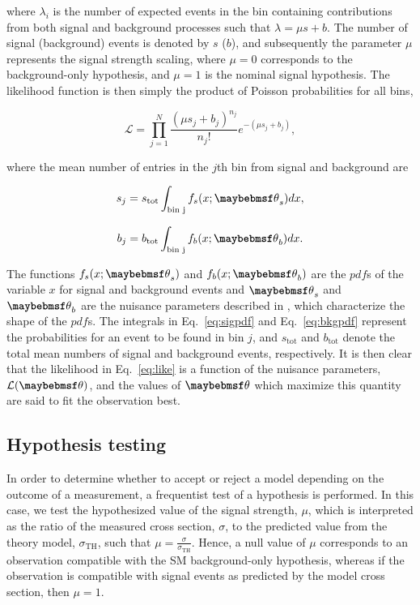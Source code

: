where $\lambda_{i}$ is the number of expected events in the bin containing contributions from both signal and background processes such that $\lambda = \mu s + b$. The number of signal (background) events is denoted by $s$ ($b$), and subsequently the parameter $\mu$ represents the signal strength scaling, where $\mu=0$ corresponds to the background-only hypothesis, and $\mu=1$ is the nominal signal hypothesis. The likelihood function is then simply the product of Poisson probabilities for all bins,

\begin{equation}
  \mathcal{L} = \prod_{j=1}^{N}\frac{(\mu s_{j}+b_{j})^{n_j}}{n_{j}!}e^{-(\mu s_j + b_j)},
  \label{eq:like}
\end{equation}

where the mean number of entries in the $j$th bin from signal and background are

\begin{equation}
  s_{j}  = s_{\textrm{tot}}\int_{\textrm{bin j}} f_{s}(x;\textbf{\theta}_{s})dx, 
\label{eq:sigpdf}
\end{equation}

\begin{equation}
  b_{j}  = b_{\textrm{tot}}\int_{\textrm{bin j}} f_{b}(x;\textbf{\theta}_{b})dx. 
\label{eq:bkgpdf}
\end{equation}

The functions $f_{s}(x;\textbf{\theta}_{s})$ and $f_{b}(x;\textbf{\theta}_{b})$ are the $pdf$s of the variable $x$ for signal and background events and $\textbf{\theta}_s$ and $\textbf{\theta}_b$ are the nuisance parameters described in , which characterize the shape of the $pdf$s. The integrals in Eq.~\ref{eq:sigpdf} and Eq.~\ref{eq:bkgpdf} represent the probabilities for an event to be found in bin $j$, and $s_\mathrm{tot}$ and $b_\mathrm{tot}$ denote the total mean numbers of signal and background events, respectively. It is then clear that the likelihood in Eq.~\ref{eq:like} is a function of the nuisance parameters, $\mathcal{L}(\textbf{\theta})$, and the values of $\textbf{\theta}$ which maximize this quantity are said to fit the observation best.

\subsection{Hypothesis testing}
\label{subsec:hypothesis}

In order to determine whether to accept or reject a model depending on the outcome of a measurement, a frequentist test of a hypothesis is performed. In this case, we test the hypothesized value of the signal strength, $\mu$, which is interpreted as the ratio of the measured cross section, $\sigma$, to the predicted value from the theory model, $\sigma_{\textrm{TH}}$, such that $\mu=\frac{\sigma}{\sigma_{\textrm{TH}}}$. Hence, a null value of $\mu$ corresponds to an observation compatible with the SM background-only hypothesis, whereas if the observation is compatible with signal events as predicted by the model cross section, then $\mu=1$. 

